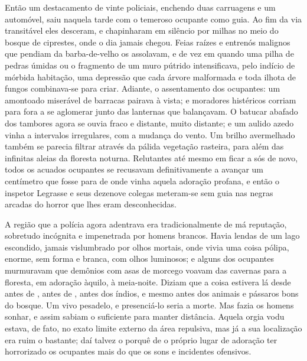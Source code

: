 \begin{pages}
\begin{Rightside}
Então um destacamento de vinte policiais, enchendo duas carruagens e um
automóvel, saiu naquela tarde com o temeroso ocupante como guia. Ao fim
da via transitável eles desceram, e chapinharam em silêncio por milhas
no meio do bosque de ciprestes, onde o dia jamais chegou. Feias raízes e
entrenós malignos que pendiam da barba-de-velho os assolavam, e de vez
em quando uma pilha de pedras úmidas ou o fragmento de um muro pútrido
intensificava, pelo indício de mórbida habitação, uma depressão que cada
árvore malformada e toda ilhota de fungos combinava-se para criar.
Adiante, o assentamento dos ocupantes: um amontoado miserável de
barracas pairava à vista; e moradores histéricos corriam para fora a se
aglomerar junto das lanternas que balançavam. O batucar abafado dos
tambores agora se ouvia fraco e distante, muito distante; e um aulido
azedo vinha a intervalos irregulares, com a mudança do vento. Um brilho
avermelhado também se parecia filtrar através da pálida vegetação
rasteira, para além das infinitas aleias da floresta noturna. Relutantes
até mesmo em ficar a sós de novo, todos os acuados ocupantes se
recusavam definitivamente a avançar um centímetro que fosse para de onde
vinha aquela adoração profana, e então o inspetor Legrasse e seus
dezenove colegas meteram-se sem guia nas negras arcadas do horror que
lhes eram desconhecidas.

A região que a polícia agora adentrava era tradicionalmente de má
reputação, sobretudo incógnita e impenetrada por homens brancos. Havia
lendas de um lago escondido, jamais vislumbrado por olhos mortais, onde
vivia uma coisa pólipa, enorme, sem forma e branca, com olhos luminosos;
e alguns dos ocupantes murmuravam que demônios com asas de morcego
voavam das cavernas para a floresta, em adoração àquilo, à meia-noite.
Diziam que a coisa estivera lá desde antes de , antes de , antes dos índios, e mesmo antes
dos animais e pássaros bons do bosque. Um vivo pesadelo, e presenciá-lo
seria a morte. Mas fazia os homens sonhar, e assim sabiam o suficiente
para manter distância. Aquela orgia vodu estava, de fato, no exato
limite externo da área repulsiva, mas já a sua localização era ruim o
bastante; daí talvez o porquê de o próprio lugar de adoração ter
horrorizado os ocupantes mais do que os sons e incidentes ofensivos.


\end{Rightside}
\end{pages}
